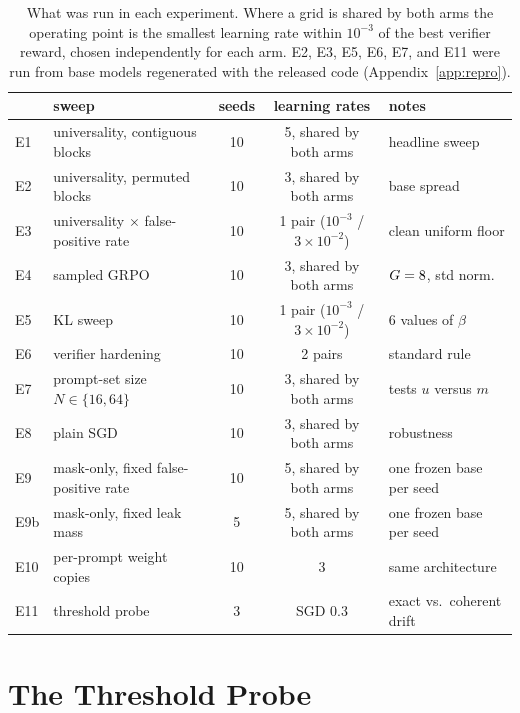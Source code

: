 \begin{table}[h]
\centering\footnotesize
\setlength{\tabcolsep}{4pt}\begin{tabular}{llcc@{\hspace{4pt}}l}
\toprule
 & sweep & seeds & learning rates & notes \\
\midrule
E1 & universality, contiguous blocks & 10 & 5, shared by both arms & headline sweep \\
E2 & universality, permuted blocks   & 10 & 3, shared by both arms & base spread \NuSixBaseSpread{} \\
E3 & universality $\times$ false-positive rate & 10 & 1 pair ($10^{-3}$ / $3\!\times\!10^{-2}$) & clean uniform floor \\
E4 & sampled GRPO                     & 10 & 3, shared by both arms & $G=8{}$, std norm. \\
E5 & KL sweep                         & 10 & 1 pair ($10^{-3}$ / $3\!\times\!10^{-2}$) & 6 values of $\beta$ \\
E6 & verifier hardening               & 10 & 2 pairs & standard rule \\
E7 & prompt-set size $N\in\{16,64\}$   & 10 & 3, shared by both arms & tests $u$ versus $m$ \\
E8 & plain SGD                        & 10 & 3, shared by both arms & robustness \\
E9 & mask-only, fixed false-positive rate & 10 & 5, shared by both arms & one frozen base per seed \\
E9b & mask-only, fixed leak mass & 5 & 5, shared by both arms & one frozen base per seed \\
E10 & per-prompt weight copies         & 10 & 3 & same architecture \\
E11 & threshold probe                  & 3 & SGD $0.3$ & exact vs.\ coherent drift \\
\bottomrule
\end{tabular}
\caption{What was run in each experiment. Where a grid is shared by both arms the operating point is the smallest learning rate within $10^{-3}$ of the best verifier reward, chosen independently for each arm. E2, E3, E5, E6, E7, and E11 were run from base models regenerated with the released code (Appendix~\ref{app:repro}).}
\label{tab:protocol}
\end{table}

\section{The Threshold Probe}
\label{app:probe}


